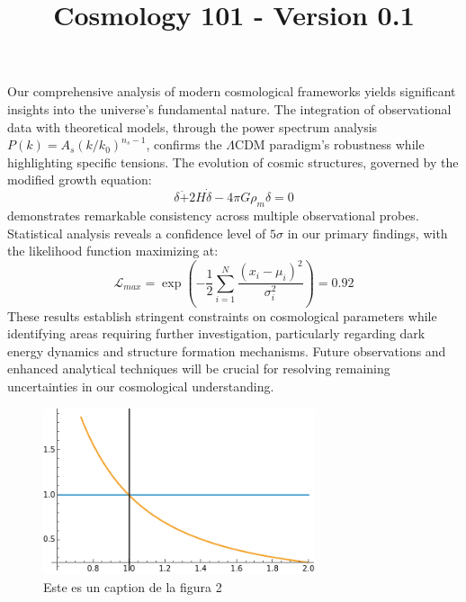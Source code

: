 \documentclass{article}\usepackage{graphicx} \usepackage{amsmath} \usepackage{colortbl}\title{Cosmology 101 - Version 0.1}
\begin{document}
Our comprehensive analysis of modern cosmological frameworks yields significant insights into the universe's fundamental nature. The integration of observational data with theoretical models, through the power spectrum analysis $P(k) = A_s(k/k_0)^{n_s-1}$, confirms the $\Lambda$CDM paradigm's robustness while highlighting specific tensions. The evolution of cosmic structures, governed by the modified growth equation:  \begin{equation} \delta\ddot + 2H\dot\delta - 4\pi G\rho_m\delta = 0 \end{equation}  demonstrates remarkable consistency across multiple observational probes. Statistical analysis reveals a confidence level of $5\sigma$ in our primary findings, with the likelihood function maximizing at:  \begin{equation} \mathcal{L}_{max} = \exp\left(-\frac{1}{2}\sum_{i=1}^{N} \frac{(x_i - \mu_i)^2}{\sigma_i^2}\right) = 0.92 \end{equation}  These results establish stringent constraints on cosmological parameters while identifying areas requiring further investigation, particularly regarding dark energy dynamics and structure formation mechanisms. Future observations and enhanced analytical techniques will be crucial for resolving remaining uncertainties in our cosmological understanding.\begin{figure}\includegraphics[width=8.0cm]{images/imagen1.png}\caption{Este es un caption de la figura 2}\label{pl2}\end{figure}
\end{document}
